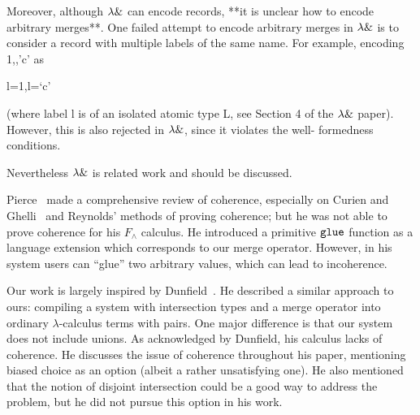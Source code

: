 Moreover, although $\lambda \&$ can encode records, **it is unclear how to encode
arbitrary merges**. One failed attempt to encode arbitrary merges in $\lambda \&$
is to consider a record with multiple labels of the same name. For example,
encoding 1,,’c’ as

{l=1,l=‘c’}

(where label l is of an isolated atomic type L, see Section 4 of the $\lambda \&$
paper). However, this is also rejected in $\lambda \&$, since it violates the well-
formedness conditions.

Nevertheless $\lambda \&$ is related work and should be discussed.

Pierce~\cite{pierce1991programming2} made a comprehensive review
of coherence, especially on Curien and Ghelli~\cite{curienl1990coherence} and
Reynolds' methods of proving coherence; but he was not able to prove coherence
for his $F_\wedge$ calculus. He introduced a primitive $\texttt{glue}$ function as
a language extension which corresponds to our merge operator. However, in his
system users can ``glue'' two arbitrary values, which can lead to incoherence.

Our work is largely inspired by Dunfield~\cite{dunfield2014elaborating}. He
described a similar approach to ours: compiling a system with intersection types
and a merge operator into ordinary $ \lambda $-calculus terms with pairs. One
major difference is that our system does not include unions. As
acknowledged by Dunfield, his calculus lacks of coherence. He discusses the
issue of coherence throughout his paper, mentioning biased choice as an option
(albeit a rather unsatisfying one). He also mentioned that the notion of
disjoint intersection could be a good way to address the problem, but he did not
pursue this option in his work.





%

